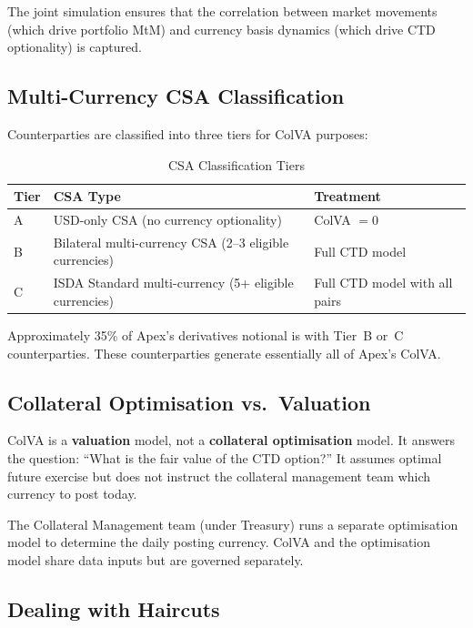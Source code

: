 \documentclass[11pt,a4paper]{article}
\begin{document}
The joint simulation ensures that the correlation between market movements (which drive
portfolio MtM) and currency basis dynamics (which drive CTD optionality) is captured.

\subsection{Multi-Currency CSA Classification}

Counterparties are classified into three tiers for ColVA purposes:

\begin{table}[h!]
\centering
\caption{CSA Classification Tiers}
\begin{tabular}{@{}llp{7cm}@{}}
\toprule
\textbf{Tier} & \textbf{CSA Type} & \textbf{Treatment} \\
\midrule
A & USD-only CSA (no currency optionality) & ColVA $= 0$ \\
B & Bilateral multi-currency CSA (2--3 eligible currencies) & Full CTD model \\
C & ISDA Standard multi-currency (5+ eligible currencies) & Full CTD model with all pairs \\
\bottomrule
\end{tabular}
\end{table}

Approximately 35\% of Apex's derivatives notional is with Tier~B or~C counterparties. These
counterparties generate essentially all of Apex's ColVA.

\subsection{Collateral Optimisation vs.\ Valuation}

ColVA is a \textbf{valuation} model, not a \textbf{collateral optimisation} model. It answers
the question: ``What is the fair value of the CTD option?'' It assumes optimal future exercise
but does not instruct the collateral management team which currency to post today.

The Collateral Management team (under Treasury) runs a separate optimisation model to determine
the daily posting currency. ColVA and the optimisation model share data inputs but are governed
separately.

\subsection{Dealing with Haircuts}
\end{document}
